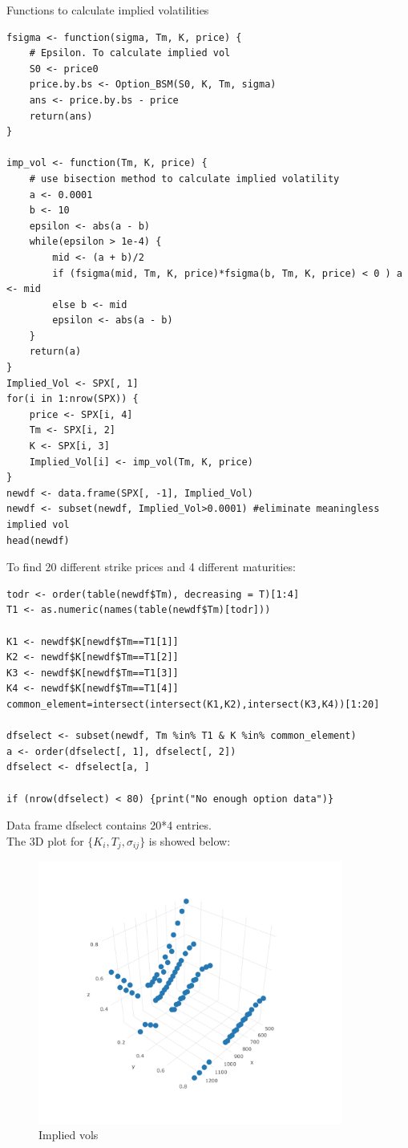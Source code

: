 \documentclass{article}
\begin{document}
Functions to calculate implied volatilities
\begin{verbatim}
fsigma <- function(sigma, Tm, K, price) {
    # Epsilon. To calculate implied vol
    S0 <- price0
    price.by.bs <- Option_BSM(S0, K, Tm, sigma)
    ans <- price.by.bs - price
    return(ans)
}

imp_vol <- function(Tm, K, price) {
    # use bisection method to calculate implied volatility
    a <- 0.0001
    b <- 10
    epsilon <- abs(a - b)
    while(epsilon > 1e-4) {
        mid <- (a + b)/2
        if (fsigma(mid, Tm, K, price)*fsigma(b, Tm, K, price) < 0 ) a <- mid
        else b <- mid
        epsilon <- abs(a - b)
    }
    return(a)
}
Implied_Vol <- SPX[, 1]
for(i in 1:nrow(SPX)) {
    price <- SPX[i, 4]
    Tm <- SPX[i, 2]
    K <- SPX[i, 3]
    Implied_Vol[i] <- imp_vol(Tm, K, price)
}
newdf <- data.frame(SPX[, -1], Implied_Vol)
newdf <- subset(newdf, Implied_Vol>0.0001) #eliminate meaningless implied vol
head(newdf)
\end{verbatim}

To find 20 different strike prices and 4 different maturities:
\begin{verbatim}
todr <- order(table(newdf$Tm), decreasing = T)[1:4]
T1 <- as.numeric(names(table(newdf$Tm)[todr]))

K1 <- newdf$K[newdf$Tm==T1[1]]
K2 <- newdf$K[newdf$Tm==T1[2]]
K3 <- newdf$K[newdf$Tm==T1[3]]
K4 <- newdf$K[newdf$Tm==T1[4]]
common_element=intersect(intersect(K1,K2),intersect(K3,K4))[1:20]

dfselect <- subset(newdf, Tm %in% T1 & K %in% common_element)
a <- order(dfselect[, 1], dfselect[, 2])
dfselect <- dfselect[a, ]

if (nrow(dfselect) < 80) {print("No enough option data")}
\end{verbatim}

Data frame dfselect contains 20*4 entries. \\

The 3D plot for $\{ {K_i},{T_j},{\sigma _{ij}}\} $ is showed below:

\begin{figure}[h] 
\begin{center} 
\includegraphics[width = 10cm]{imp2.png}  
\caption{Implied vols} 
\end{center} 
\end{figure}
\end{document}
